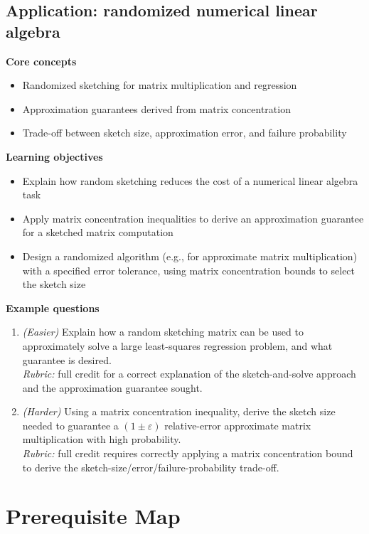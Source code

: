 \documentclass[11pt]{article}
\begin{document}
\subsection{Application: randomized numerical linear algebra}
\textbf{Core concepts}
\begin{itemize}[nosep]
\item Randomized sketching for matrix multiplication and regression
\item Approximation guarantees derived from matrix concentration
\item Trade-off between sketch size, approximation error, and failure probability
\end{itemize}
\textbf{Learning objectives}
\begin{itemize}[nosep]
\item Explain how random sketching reduces the cost of a numerical linear algebra task
\item Apply matrix concentration inequalities to derive an approximation guarantee for a sketched matrix computation
\item Design a randomized algorithm (e.g., for approximate matrix multiplication) with a specified error tolerance, using matrix concentration bounds to select the sketch size
\end{itemize}
\textbf{Example questions}
\begin{enumerate}[nosep]
\item \emph{(Easier)} Explain how a random sketching matrix can be used to approximately solve a large least-squares regression problem, and what guarantee is desired. \\
\emph{Rubric:} full credit for a correct explanation of the sketch-and-solve approach and the approximation guarantee sought.
\item \emph{(Harder)} Using a matrix concentration inequality, derive the sketch size needed to guarantee a $(1\pm\varepsilon)$ relative-error approximate matrix multiplication with high probability. \\
\emph{Rubric:} full credit requires correctly applying a matrix concentration bound to derive the sketch-size/error/failure-probability trade-off.
\end{enumerate}

\section{Prerequisite Map}
\end{document}
